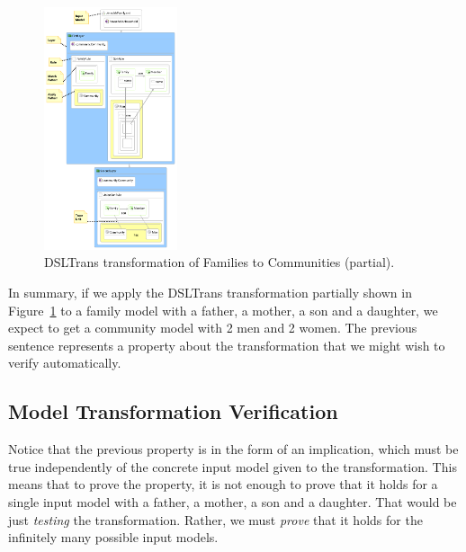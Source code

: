 \begin{figure}
\begin{center}
  \includegraphics[width=0.35\textwidth]{figures/families_to_persons_hot2}
  \caption{DSLTrans transformation of Families to Communities (partial).}
  \label{fig:families_mm}
\end{center}
\end{figure}

In summary, if we apply the DSLTrans transformation partially shown in 
Figure~\ref{fig:families_mm} to a family model with a father, a mother, a son
and a daughter, we expect to get a community model with 2 men and 2 women. The
previous sentence represents a property about the transformation that we might
wish to verify automatically.

\subsection{Model Transformation Verification}

Notice that the previous property is in the form of an implication, which must
be true independently of the concrete input model given to the transformation.
This means that to prove the property, it is not enough to prove that it holds
for a single input model with a father, a mother, a son and a daughter. That
would be just \emph{testing} the transformation.
Rather, we must \emph{prove} that it holds for the infinitely many possible input models.

